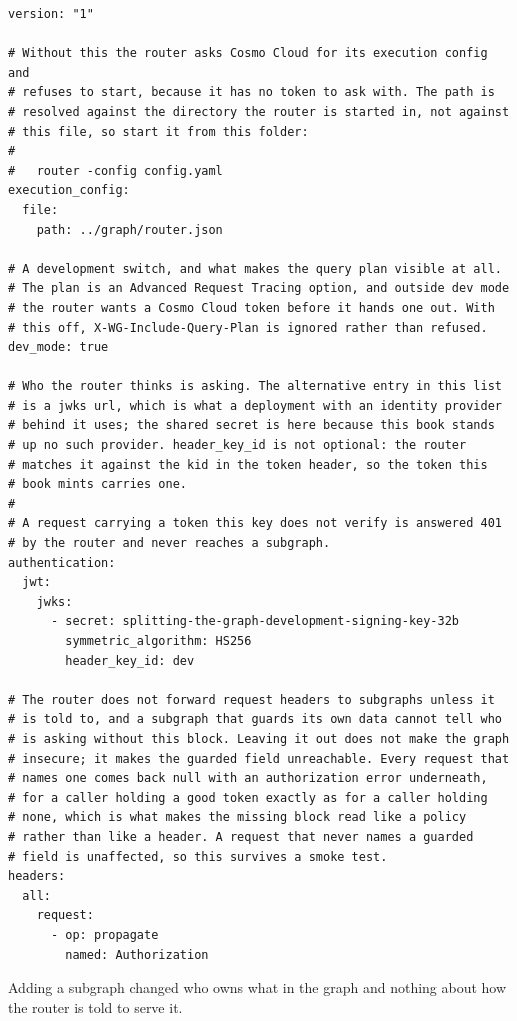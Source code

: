 \begin{verbatim}
version: "1"

# Without this the router asks Cosmo Cloud for its execution config and
# refuses to start, because it has no token to ask with. The path is
# resolved against the directory the router is started in, not against
# this file, so start it from this folder:
#
#   router -config config.yaml
execution_config:
  file:
    path: ../graph/router.json

# A development switch, and what makes the query plan visible at all.
# The plan is an Advanced Request Tracing option, and outside dev mode
# the router wants a Cosmo Cloud token before it hands one out. With
# this off, X-WG-Include-Query-Plan is ignored rather than refused.
dev_mode: true

# Who the router thinks is asking. The alternative entry in this list
# is a jwks url, which is what a deployment with an identity provider
# behind it uses; the shared secret is here because this book stands
# up no such provider. header_key_id is not optional: the router
# matches it against the kid in the token header, so the token this
# book mints carries one.
#
# A request carrying a token this key does not verify is answered 401
# by the router and never reaches a subgraph.
authentication:
  jwt:
    jwks:
      - secret: splitting-the-graph-development-signing-key-32b
        symmetric_algorithm: HS256
        header_key_id: dev

# The router does not forward request headers to subgraphs unless it
# is told to, and a subgraph that guards its own data cannot tell who
# is asking without this block. Leaving it out does not make the graph
# insecure; it makes the guarded field unreachable. Every request that
# names one comes back null with an authorization error underneath,
# for a caller holding a good token exactly as for a caller holding
# none, which is what makes the missing block read like a policy
# rather than like a header. A request that never names a guarded
# field is unaffected, so this survives a smoke test.
headers:
  all:
    request:
      - op: propagate
        named: Authorization
\end{verbatim}

Adding a subgraph changed who owns what in the graph and nothing about how the
router is told to serve it.
%

